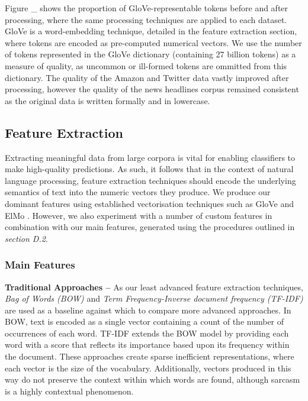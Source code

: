 \documentclass[12pt,a4paper]{article}
\begin{document}
\noindent Figure \_ shows the proportion of GloVe-representable tokens before and after processing, where the same processing techniques are applied to each dataset. GloVe is a word-embedding technique, detailed in the feature extraction section, where tokens are encoded as pre-computed numerical vectors. We use the number of tokens represented in the GloVe dictionary (containing 27 billion tokens) as a measure of quality, as uncommon or ill-formed tokens are ommitted from this dictionary. The quality of the Amazon and Twitter data vastly improved after processing, however the quality of the news headlines corpus remained consistent as the original data is written formally and in lowercase.



\subsection{Feature Extraction}
\vspace{-4.2pt}
\noindent Extracting meaningful data from large corpora is vital for enabling classifiers to make high-quality predictions. As such, it follows that in the context of natural language processing, feature extraction techniques should encode the underlying semantics of text into the numeric vectors they produce. We produce our dominant features using established vectorisation techniques such as GloVe \cite{pennington2014glove} and ElMo \cite{peters2018deep}. However, we also experiment with a number of custom features in combination with our main features, generated using the procedures outlined in \textit{section D.2}. \vspace{-4.2pt}

\subsubsection{Main Features}
\noindent \textbf{Traditional Approaches --} As our least advanced feature extraction techniques, \textit{Bag of Words (BOW)} and \textit{Term Frequency-Inverse document frequency (TF-IDF)} \cite{robertson1976relevance} are used as a baseline against which to compare more advanced approaches. In BOW, text is encoded as a single vector containing a count of the number of occurrences of each word. TF-IDF extends the BOW model by providing each word with a score that reflects its importance based upon its frequency within the document. These approaches create sparse inefficient representations, where each vector is the size of the vocabulary. Additionally, vectors produced in this way do not preserve the context within which words are found, although sarcasm is a highly contextual phenomenon.\\
\end{document}
